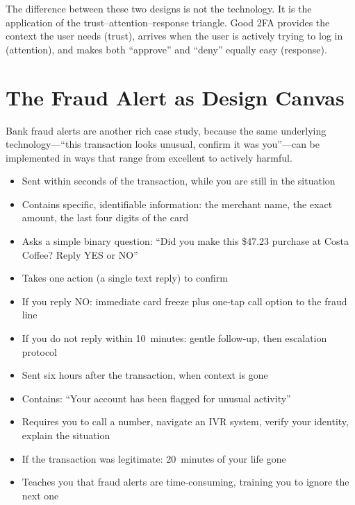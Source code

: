 The difference between these two designs is not the technology. It is the application of the trust--attention--response triangle. Good 2FA provides the context the user needs (trust), arrives when the user is actively trying to log in (attention), and makes both ``approve'' and ``deny'' equally easy (response).

\section{The Fraud Alert as Design Canvas}
\label{sec:ch05-fraud-alert}

Bank fraud alerts are another rich case study, because the same underlying technology---``this transaction looks unusual, confirm it was you''---can be implemented in ways that range from excellent to actively harmful.

\begin{examplebox}
\begin{itemize}
  \item Sent within seconds of the transaction, while you are still in the situation
  \item Contains specific, identifiable information: the merchant name, the exact amount, the last four digits of the card
  \item Asks a simple binary question: ``Did you make this \$47.23 purchase at Costa Coffee? Reply YES or NO''
  \item Takes one action (a single text reply) to confirm
  \item If you reply NO: immediate card freeze plus one-tap call option to the fraud line
  \item If you do not reply within 10~minutes: gentle follow-up, then escalation protocol
\end{itemize}
\end{examplebox}

\begin{cautionbox}
\begin{itemize}
  \item Sent six hours after the transaction, when context is gone
  \item Contains: ``Your account has been flagged for unusual activity''
  \item Requires you to call a number, navigate an IVR system, verify your identity, explain the situation
  \item If the transaction was legitimate: 20~minutes of your life gone
  \item Teaches you that fraud alerts are time-consuming, training you to ignore the next one
\end{itemize}
\end{cautionbox}


